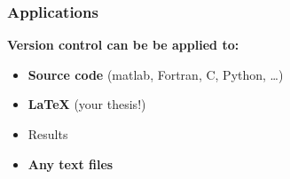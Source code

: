 \documentclass{beamer}
\begin{document}

\begin{frame}
  \frametitle{Applications}
  \textbf{\Large Version control can be be applied to:}
  \begin{itemize}
  \item \textbf{Source code} (matlab, Fortran, C, Python, \dots)
  \item \textbf{LaTeX} (your thesis!)
  \item Results
  \item \textbf{Any text files}\footnotemark
  \end{itemize}
\end{frame}

\end{document}
